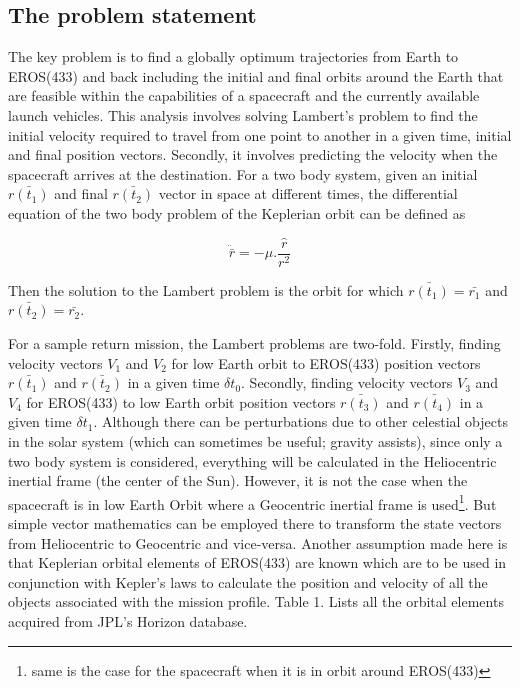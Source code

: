 \documentclass[11pt,a4paper]{article}
\newcommand*\ruleline[1]{\par\noindent\raisebox{.8ex}{\makebox[\linewidth]{\hrulefill\hspace{1ex}\raisebox{-.8ex}{#1}\hspace{1ex}\hrulefill}}}
\DeclareRobustCommand{\mysymb}{{\usefont{U}{MnSymbolC}{m}{n}\symbol{"36}}}
\begin{document}
\ruleline{\mysymb{} }
\begin{multicols}{2}
\section{The problem statement}
The key problem is to find a globally optimum trajectories from Earth to  EROS(433) and back including the initial and final orbits around the Earth that are feasible within the capabilities of a spacecraft and the currently available launch vehicles. This analysis involves solving Lambert's problem to find the initial velocity required to travel from one point to another in a given time, initial and final position vectors. Secondly, it involves predicting the velocity when the spacecraft arrives at the destination. For a two body system, given an initial $\bar{r(t_1)}$ and final $\bar{r(t_2)}$ vector in space at different times,  the differential equation of the two body problem of the Keplerian orbit can be defined as

$$\ddot{\bar{r}}=-\mu . \frac{\hat{r}}{r^2}$$

Then the solution to the Lambert problem is the orbit for which  $\bar{r(t_1)}=\bar{r_1}$ and $\bar{r(t_2)}=\bar{r_2}$. 

For a sample return mission, the Lambert problems are two-fold. Firstly, finding velocity vectors $V_1$ and $V_2$ for low Earth orbit to EROS(433) position vectors $\bar{r(t_1)}$ and $\bar{r(t_2)}$ in a given time $\delta t_0$. Secondly, finding velocity vectors $V_3$ and $V_4$ for EROS(433) to low Earth orbit position vectors $\bar{r(t_3)}$ and $\bar{r(t_4)}$ in a given time $\delta t_1$. Although there can be perturbations due to other celestial objects in the solar system (which can sometimes be useful; gravity assists), since only a two body system is considered, everything will be calculated in the Heliocentric inertial frame (the center of the Sun). However, it is not the case when the spacecraft is in low Earth Orbit where a Geocentric inertial frame is used\footnote{same is the case for the spacecraft when it is in orbit around EROS(433)}. But simple vector mathematics can be employed there to transform the state vectors from Heliocentric to Geocentric and vice-versa. Another assumption made here is that Keplerian orbital elements of EROS(433) are known which are to be used in conjunction with Kepler's laws to calculate the position and velocity of all the objects associated with the mission profile. 
Table 1. Lists all the orbital elements acquired from JPL's Horizon database.


\end{multicols}
\end{document}
